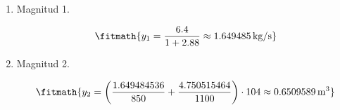 \begin{enumerate}

\item Magnitud 1.

\[\fitmath{y_{1}=\frac{6.4}{1+2.88}\approx 1.649485\,\mathrm{kg/s}}\]

\item Magnitud 2.

\[\fitmath{y_{2}=\left(\frac{1.649484536}{850}+\frac{4.750515464}{1100}\right)\cdot 104\approx 0.6509589\,\mathrm{m^{3}}}\]

\end{enumerate}
